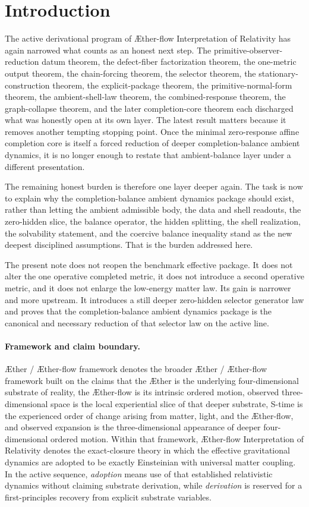 \documentclass[11pt]{article}
\newcommand{\Aether}{\AE{}ther}
\newcommand{\Aflow}{\AE{}ther-flow}
\newcommand{\TheoryName}{\Aflow{} Interpretation of Relativity}
\newcommand{\TheoryProgram}{\Aether{} / \Aflow{} framework}
\begin{document}
\section{Introduction}

The active derivational program of \TheoryName{} has again narrowed what counts as an honest next step. The primitive-observer-reduction datum theorem, the defect-fiber factorization theorem, the one-metric output theorem, the chain-forcing theorem, the selector theorem, the stationary-construction theorem, the explicit-package theorem, the primitive-normal-form theorem, the ambient-shell-law theorem, the combined-response theorem, the graph-collapse theorem, and the later completion-core theorem each discharged what was honestly open at its own layer. The latest result matters because it removes another tempting stopping point. Once the minimal zero-response affine completion core is itself a forced reduction of deeper completion-balance ambient dynamics, it is no longer enough to restate that ambient-balance layer under a different presentation.

The remaining honest burden is therefore one layer deeper again. The task is now to explain why the completion-balance ambient dynamics package should exist, rather than letting the ambient admissible body, the data and shell readouts, the zero-hidden slice, the balance operator, the hidden splitting, the shell realization, the solvability statement, and the coercive balance inequality stand as the new deepest disciplined assumptions. That is the burden addressed here.

The present note does not reopen the benchmark effective package. It does not alter the one operative completed metric, it does not introduce a second operative metric, and it does not enlarge the low-energy matter law. Its gain is narrower and more upstream. It introduces a still deeper zero-hidden selector generator law and proves that the completion-balance ambient dynamics package is the canonical and necessary reduction of that selector law on the active line.

\paragraph{Framework and claim boundary.}
\TheoryProgram{} denotes the broader \Aether{} / \Aflow{} framework built on the claims that the \Aether{} is the underlying four-dimensional substrate of reality, the \Aflow{} is its intrinsic ordered motion, observed three-dimensional space is the local experiential slice of that deeper substrate, S-time is the experienced order of change arising from matter, light, and the \Aflow{}, and observed expansion is the three-dimensional appearance of deeper four-dimensional ordered motion. Within that framework, \TheoryName{} denotes the exact-closure theory in which the effective gravitational dynamics are adopted to be exactly Einsteinian with universal matter coupling. In the active sequence, \emph{adoption} means use of that established relativistic dynamics without claiming substrate derivation, while \emph{derivation} is reserved for a first-principles recovery from explicit substrate variables.
\end{document}
